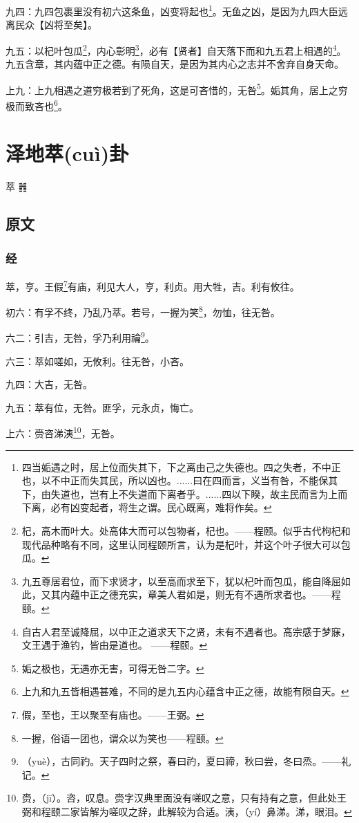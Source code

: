 \documentclass[12pt,oneside]{book}
\begin{document}
九四：九四包裹里没有初六这条鱼，凶变将起也\footnote{四当姤遇之时，居上位而失其下，下之离由己之失德也。四之失者，不中正也，以不中正而失其民，所以凶也。......曰在四而言，义当有咎，不能保其下，由失道也，岂有上不失道而下离者乎。......四以下睽，故主民而言为上而下离，必有凶变起者，将生之谓。民心既离，难将作矣。}。无鱼之凶，是因为九四大臣远离民众【凶将至矣】。

九五：以杞叶包瓜\footnote{杞，高木而叶大。处高体大而可以包物者，杞也。——程颐。似乎古代枸杞和现代品种略有不同，这里认同程颐所言，认为是杞叶，并这个叶子很大可以包瓜。}，内心彰明\footnote{九五尊居君位，而下求贤才，以至高而求至下，犹以杞叶而包瓜，能自降屈如此，又其内蕴中正之德充实，章美人君如是，则无有不遇所求者也。——程颐。}，必有【贤者】自天落下而和九五君上相遇的\footnote{自古人君至诚降屈，以中正之道求天下之贤，未有不遇者也。高宗感于梦寐，文王遇于渔钓，皆由是道也。 ——程颐。}。九五含章，其内蕴中正之德。有陨自天，是因为其内心之志并不舍弃自身天命。

上九：上九相遇之道穷极若到了死角，这是可吝惜的，无咎\footnote{姤之极也，无遇亦无害，可得无咎二字。}。姤其角，居上之穷极而致吝也\footnote{上九和九五皆相遇甚难，不同的是九五内心蕴含中正之德，故能有陨自天。}。



\chapter{泽地萃(cuì)卦}
萃 {\Large ䷬}
\section{原文}

\subsection{经}
萃，亨。王假\footnote{假，至也，王以聚至有庙也。——王弼。}有庙，利见大人，亨，利贞。用大牲，吉。利有攸往。

初六：有孚不终，乃乱乃萃。若号，一握为笑\footnote{一握，俗语一团也，谓众以为笑也——程颐。}，勿恤，往无咎。

六二：引吉，无咎，孚乃利用禴\footnote{（yuè），古同礿。天子四时之祭，春曰礿，夏曰禘，秋曰尝，冬曰烝。——礼记。}。

六三：萃如嗟如，无攸利。往无咎，小吝。

九四：大吉，无咎。

九五：萃有位，无咎。匪孚，元永贞，悔亡。

上六：赍咨涕洟\footnote{赍，（jī）。咨，叹息。赍字汉典里面没有嗟叹之意，只有持有之意，但此处王弼和程颐二家皆解为嗟叹之辞，此解较为合适。洟，（yí）鼻涕。涕，眼泪。}，无咎。
\end{document}
